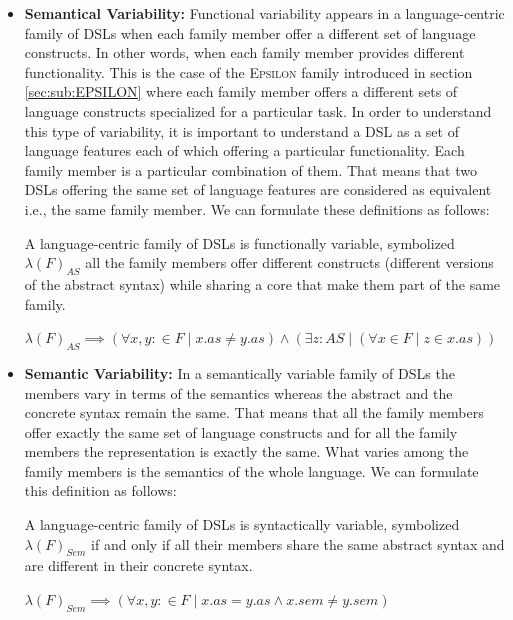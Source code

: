 \begin{itemize}
\item \textbf{Semantical Variability:} Functional variability appears in a language-centric family of DSLs when each family member offer a different set of language constructs. In other words, when each family member provides different functionality. This is the case of the \textsc{Epsilon} family introduced in section \ref{sec:sub:EPSILON} where each family member offers a different sets of language constructs specialized for a particular task. In order to understand this type of variability, it is important to understand a DSL as a set of language features each of which offering a particular functionality. Each family member is a particular combination of them. That means that two DSLs offering the same set of language features are considered as equivalent i.e., the same family member. We can formulate these definitions as follows:

\begin{mydef} A language-centric family of DSLs is functionally variable, symbolized $\lambda(F)_{AS}$ all the family members offer different constructs (different versions of the abstract syntax) while sharing a core that make them part of the same family.
\vspace{-1mm}
\begin{center}
$\lambda(F)_{AS} \implies (\forall x,y :\in F \mid x.as \neq y.as) \wedge (\exists z : AS \mid (\forall x \in F \mid z \in x.as))$
\end{center}
\end{mydef}

\vspace{3mm}

\item \textbf{Semantic Variability:} In a semantically variable family of DSLs the members vary in terms of the semantics whereas the abstract and the concrete syntax remain the same. That means that all the family members offer exactly the same set of language constructs and for all the family members the representation is exactly the same. What varies among the family members is the semantics of the whole language. We can formulate this definition as follows: 

\begin{mydef} A language-centric family of DSLs is syntactically variable, symbolized $\lambda(F)_{Sem}$ if and only if all their members share the same abstract syntax and are different in their concrete syntax. 
\vspace{-1mm}
\begin{center}
$\lambda(F)_{Sem} \implies (\forall x,y :\in F \mid x.as = y.as \wedge x.sem \neq y.sem)$
\end{center}
\end{mydef}

\end{itemize}

